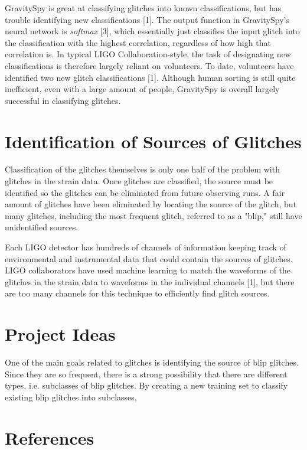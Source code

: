 \documentclass[a4paper]{article}
\begin{document}
GravitySpy is great at classifying glitches into known classifications, but has trouble identifying new classifications [1]. The output function in GravitySpy's neural network is \textit{softmax} [3], which essentially just classifies the input glitch into the classification with the highest correlation, regardless of how high that correlation is. In typical LIGO Collaboration-style, the task of designating new classifications is therefore largely reliant on volunteers. To date, volunteers have identified two new glitch classifications [1]. Although human sorting is still quite inefficient, even with a large amount of people, GravitySpy is overall largely successful in classifying glitches.

\section{Identification of Sources of Glitches}

Classification of the glitches themselves is only one half of the problem with glitches in the strain data. Once glitches are classified, the source must be identified so the glitches can be eliminated from future observing runs. A fair amount of glitches have been eliminated by locating the source of the glitch, but many glitches, including the most frequent glitch, referred to as a "blip," still have unidentified sources.

Each LIGO detector has hundreds of channels of information keeping track of environmental and instrumental data that could contain the sources of glitches. LIGO collaborators have used machine learning to match the waveforms of the glitches in the strain data to waveforms in the individual channels [1], but there are too many channels for this technique to efficiently find glitch sources.

\section{Project Ideas}

One of the main goals related to glitches is identifying the source of blip glitches. Since they are so frequent, there is a strong possibility that there are different types, i.e. subclasses of blip glitches. By creating a new training set to classify existing blip glitches into subclasses, 

\section{References}
\end{document}
